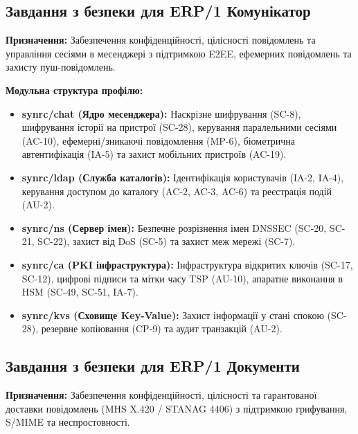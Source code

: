 \documentclass{article}
\begin{document}
\subsection{Завдання з безпеки для ERP/1 Комунікатор}

\textbf{Призначення:} Забезпечення конфіденційності, цілісності повідомлень та управління сесіями в месенджері з підтримкою E2EE,
ефемерних повідомлень та захисту пуш-повідомлень.

\textbf{Модульна структура профілю:}
\begin{itemize}
    \item \textbf{synrc/chat (Ядро месенджера):} Наскрізне шифрування (SC-8), шифрування історії на пристрої (SC-28), керування паралельними сесіями (AC-10), ефемерні/зникаючі повідомлення (MP-6), біометрична автентифікація (IA-5) та захист мобільних пристроїв (AC-19).
    \item \textbf{synrc/ldap (Служба каталогів):} Ідентифікація користувачів (IA-2, IA-4), керування доступом до каталогу (AC-2, AC-3, AC-6) та реєстрація подій (AU-2).
    \item \textbf{synrc/ns (Сервер імен):} Безпечне розрізнення імен DNSSEC (SC-20, SC-21, SC-22), захист від DoS (SC-5) та захист меж мережі (SC-7).
    \item \textbf{synrc/ca (PKI інфраструктура):} Інфраструктура відкритих ключів (SC-17, SC-12), цифрові підписи та мітки часу TSP (AU-10), апаратне виконання в HSM (SC-49, SC-51, IA-7).
    \item \textbf{synrc/kvs (Сховище Key-Value):} Захист інформації у стані спокою (SC-28), резервне копіювання (CP-9) та аудит транзакцій (AU-2).
\end{itemize}

\subsection{Завдання з безпеки для ERP/1 Документи}

\textbf{Призначення:} Забезпечення конфіденційності, цілісності та гарантованої доставки повідомлень (MHS X.420 / STANAG 4406) з підтримкою грифування, S/MIME та неспростовності.
\end{document}

